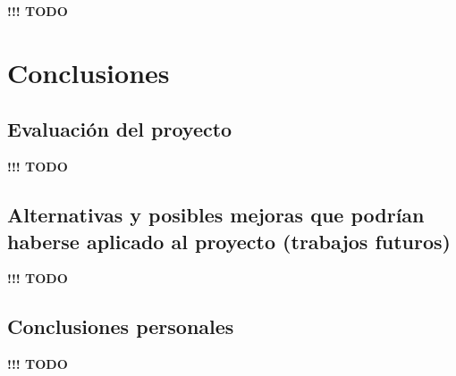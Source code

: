 \documentclass[]{article}
\begin{document}
\textbf{!!! TODO}


\section{Conclusiones}

\subsection{Evaluación del proyecto}

\textbf{!!! TODO}

\subsection{Alternativas y posibles mejoras que podrían haberse aplicado al proyecto (trabajos futuros)}

\textbf{!!! TODO}

\subsection{Conclusiones personales}

\textbf{!!! TODO}

\newpage
\printbibliography[title={Referencias}]
\end{document}
